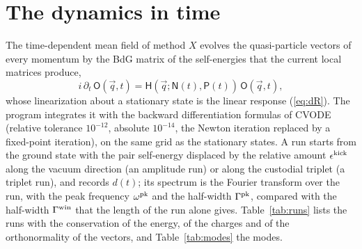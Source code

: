 \documentclass[aps,prd,onecolumn,superscriptaddress,nofootinbib,floatfix,longbibliography]{revtex4-2}
\begin{document}
\section{The dynamics in time}
\label{sec:dynamics}

The time-dependent mean field of method $X$ evolves the quasi-particle vectors of every momentum by the BdG matrix of the
self-energies that the current local matrices produce,
\begin{equation}
i\,\partial_t\,\mathsf O(\vec q,t)=\mathsf H(\vec q;\mathsf N(t),\mathsf P(t))\,\mathsf O(\vec q,t),
\label{eq:tdmf}
\end{equation}
whose linearization about a stationary state is the linear response (\ref{eq:dR}). The program integrates it with the
backward differentiation formulas of CVODE~\cite{SUNDIALS2005,SUNDIALS2022} (relative tolerance $10^{-12}$, absolute
$10^{-14}$, the Newton iteration replaced by a fixed-point iteration), on the same grid as the stationary states. A run
starts from the ground state with the pair self-energy displaced by the relative amount $\epsilon^{\rm kick}$ along the
vacuum direction (an amplitude run) or along the custodial triplet (a triplet run), and records $d(t)$; its spectrum is
the Fourier transform over the run, with the peak frequency $\omega^{\rm pk}$ and the half-width $\Gamma^{\rm pk}$, compared
with the half-width $\Gamma^{\rm win}$ that the length of the run alone gives. Table~\ref{tab:runs} lists the runs with the
conservation of the energy, of the charges and of the orthonormality of the vectors, and Table~\ref{tab:modes} the modes.
\end{document}
